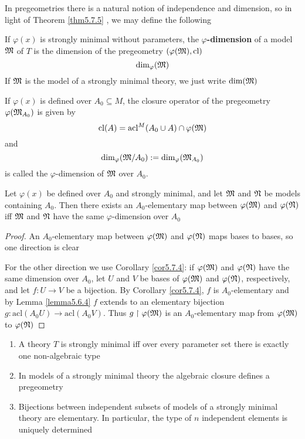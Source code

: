 \documentclass[11pt]{article}
\def \acl {\text{acl}}
\begin{document}
In pregeometries there is a natural notion of independence and dimension, so in light of Theorem
\ref{thm5.7.5} , we may define the following

If \(\varphi(x)\) is strongly minimal without parameters, the \textbf{\(\varphi\)-dimension} of a model \(\mathfrak{M}\)
of \(T\) is the dimension of the pregeometry \((\varphi(\mathfrak{M}),\operatorname{\text{cl}})\)
\begin{equation*}
\dim_\varphi(\mathfrak{M})
\end{equation*}
If \(\mathfrak{M}\) is the model of a strongly minimal theory, we just write \(\dim(\mathfrak{M})\)

If \(\varphi(x)\) is defined over \(A_0\subseteq M\), the closure operator of the pregeometry \(\varphi(\mathfrak{M}_{A_0})\)
is given by
\begin{equation*}
\cl(A)=\acl^M(A_0\cup A)\cap\varphi(\fM)
\end{equation*}
and
\begin{equation*}
\dim_\varphi(\mathfrak{M}/A_0):=\dim_{\varphi}(\mathfrak{M}_{A_0})
\end{equation*}
is called the \(\varphi\)-dimension of \(\mathfrak{M}\) over \(A_0\).

\begin{lemma}[]
\label{lemma5.7.6}
Let \(\varphi(x)\) be defined over \(A_0\) and strongly minimal, and let \(\mathfrak{M}\) and \(\mathfrak{N}\) be models
containing \(A_0\). Then there exists an \(A_0\)-elementary map between \(\varphi(\mathfrak{M})\) and \(\varphi(\mathfrak{N})\)
iff \(\mathfrak{M}\) and \(\mathfrak{N}\) have the same \(\varphi\)-dimension over \(A_0\)
\end{lemma}

\begin{proof}
An \(A_0\)-elementary map between \(\varphi(\mathfrak{M})\) and \(\varphi(\mathfrak{N})\) maps bases to bases, so one direction is
clear

For the other direction we use Corollary \ref{cor5.7.4}: if \(\varphi(\mathfrak{M})\) and \(\varphi(\mathfrak{N})\) have the same
dimension over \(A_0\), let \(U\) and \(V\) be bases of \(\varphi(\mathfrak{M})\) and \(\varphi(\mathfrak{N})\), respectively, and
let \(f:U\to V\) be a bijection. By Corollary \ref{cor5.7.4}, \(f\) is \(A_0\)-elementary
and by Lemma \ref{lemma5.6.4} \(f\) extends to an elementary
bijection \(g:\acl(A_0U)\to\acl(A_0V)\). Thus \(g\upharpoonright\varphi(\mathfrak{M})\) is an \(A_0\)-elementary map
from \(\varphi(\mathfrak{M})\) to \(\varphi(\mathfrak{N})\)
\end{proof}

\begin{corollary}[]
\label{cor5.7.7}
\begin{enumerate}
\item A theory \(T\) is strongly minimal iff over every parameter set there is exactly one
non-algebraic type
\item In models of a strongly minimal theory the algebraic closure defines a pregeometry
\item Bijections between independent subsets of models of a strongly minimal theory are elementary.
In particular, the type of \(n\) independent elements is uniquely determined
\end{enumerate}
\end{corollary}
\end{document}

